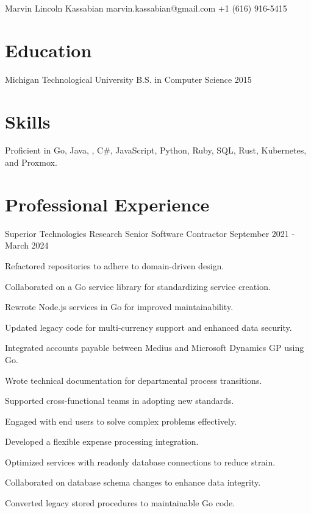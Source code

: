 \documentclass{marvinkassabian_resume}
\begin{document}
\resumeheadersimple
{Marvin Lincoln Kassabian}
{marvin.kassabian@gmail.com}
{+1 (616) 916-5415}

\section{Education}
\subsectionlocationdate
{Michigan Technological University}
{B.S. in Computer Science}
{2015}

\section{Skills}
\resumesublistbegin
\item Proficient in Go, Java, \cpp, C\#, JavaScript, Python, Ruby, SQL, Rust, Kubernetes, and Proxmox.
\resumesublistend

\section{Professional Experience}

\subsectionpositiondate
{Superior Technologies Research}
{Senior Software Contractor}
{September 2021 - March 2024}
\resumesublistbegin
\item Refactored repositories to adhere to domain-driven design.
\item Collaborated on a Go service library for standardizing service creation.
\item Rewrote Node.js services in Go for improved maintainability.
\item Updated legacy code for multi-currency support and enhanced data security.
\item Integrated accounts payable between Medius and Microsoft Dynamics GP using Go.
\item Wrote technical documentation for departmental process transitions.
\item Supported cross-functional teams in adopting new standards.
\item Engaged with end users to solve complex problems effectively.
\item Developed a flexible expense processing integration.
\item Optimized services with readonly database connections to reduce strain.
\item Collaborated on database schema changes to enhance data integrity.
\item Converted legacy stored procedures to maintainable Go code.
\resumesublistend
\end{document}
